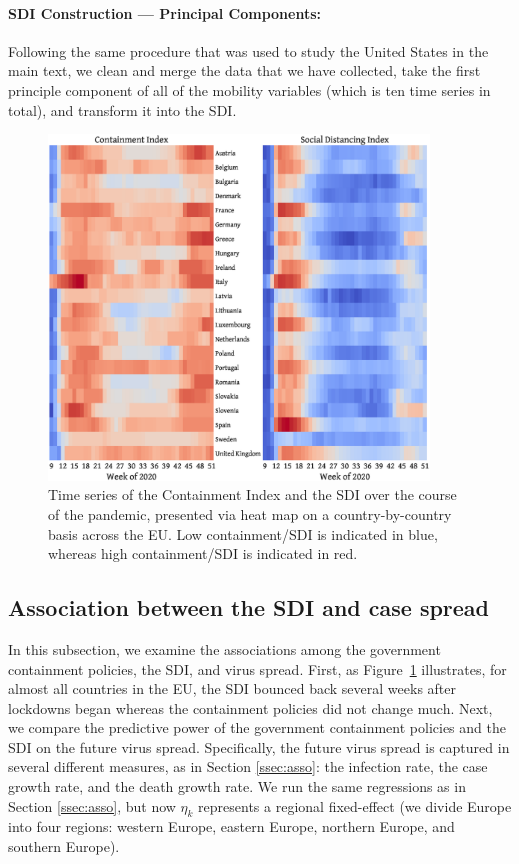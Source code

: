 \documentclass[dvipsnames]{article}
\begin{document}
\paragraph*{SDI Construction --- Principal Components:} Following the same procedure that was used to study the United States in the main text, we clean and merge the data that we have collected, take the first principle component of all of the mobility variables (which is ten time series in total), and transform it into the SDI.

\begin{figure}[h!]
    \centering
    \includegraphics[width=0.9\textwidth]{eu_sdi_containment_by_country.eps}
    \caption{Time series of the Containment Index and the SDI over the course of the pandemic, presented via heat map on a country-by-country basis across the EU. Low containment/SDI is indicated in blue, whereas high containment/SDI is indicated in red.}
    \label{fig:eu_sdi_containment_by_country}
\end{figure}

\subsection{Association between the SDI and case spread}

In this subsection, we examine the associations among the government containment policies, the SDI, and virus spread. First, as Figure~\ref{fig:eu_sdi_containment_by_country} illustrates, for almost all countries in the EU, the SDI bounced back several weeks after lockdowns began whereas the containment policies did not change much. Next, we compare the predictive power of the government containment policies and the SDI on the future virus spread. Specifically, the future virus spread is captured in several different measures, as in Section \ref{ssec:asso}: the infection rate, the case growth rate, and the death growth rate. We run the same regressions as in Section \ref{ssec:asso}, but
now $\eta_k$ represents a regional fixed-effect (we divide Europe into four regions: western Europe, eastern Europe, northern Europe, and southern Europe).
\end{document}

